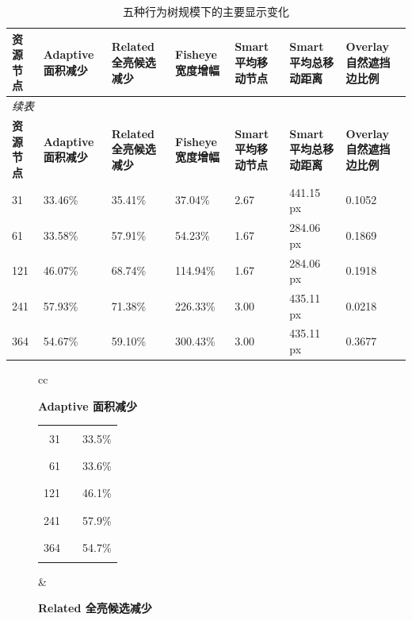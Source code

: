 \documentclass[11pt,a4paper,oneside,extrafontsizes]{memoir}
\begin{document}
\begin{center}

\begin{longtable}{@{}p{} p{} p{} p{} p{} p{} p{}@{}}
\caption{五种行为树规模下的主要显示变化}\label{tab:tree-size-results}\\
\toprule
\textbf{资源节点} & \textbf{Adaptive 面积减少} & \textbf{Related 全亮候选减少} & \textbf{Fisheye 宽度增幅} & \textbf{Smart 平均移动节点} & \textbf{Smart 平均总移动距离} & \textbf{Overlay 自然遮挡边比例} \\
\midrule
\endfirsthead
\multicolumn{7}{l}{\itshape 续表}\\
\toprule
\textbf{资源节点} & \textbf{Adaptive 面积减少} & \textbf{Related 全亮候选减少} & \textbf{Fisheye 宽度增幅} & \textbf{Smart 平均移动节点} & \textbf{Smart 平均总移动距离} & \textbf{Overlay 自然遮挡边比例} \\
\midrule
\endhead
31 & 33.46\% & 35.41\% & 37.04\% & 2.67 & 441.15 px & 0.1052 \\
61 & 33.58\% & 57.91\% & 54.23\% & 1.67 & 284.06 px & 0.1869 \\
121 & 46.07\% & 68.74\% & 114.94\% & 1.67 & 284.06 px & 0.1918 \\
241 & 57.93\% & 71.38\% & 226.33\% & 3.00 & 435.11 px & 0.0218 \\
364 & 54.67\% & 59.10\% & 300.43\% & 3.00 & 435.11 px & 0.3677 \\
\bottomrule
\end{longtable}

\begin{figure}[htbp]
\centering

\begin{tabular}{cc}
\begin{minipage}[t]{0.46\textwidth}
\centering
\textbf{Adaptive 面积减少}\\[-0.2em]

\begin{tabular}{@{}r l r@{}}
31 & \textcolor{blue!70!black}{\rule{0.1155\textwidth}{1.1ex}} & 33.5\% \\
61 & \textcolor{blue!70!black}{\rule{0.1159\textwidth}{1.1ex}} & 33.6\% \\
121 & \textcolor{blue!70!black}{\rule{0.1591\textwidth}{1.1ex}} & 46.1\% \\
241 & \textcolor{blue!70!black}{\rule{0.2000\textwidth}{1.1ex}} & 57.9\% \\
364 & \textcolor{blue!70!black}{\rule{0.1887\textwidth}{1.1ex}} & 54.7\% \\
\end{tabular}
\end{minipage}
&
\begin{minipage}[t]{0.46\textwidth}
\centering
\textbf{Related 全亮候选减少}\\[-0.2em]


\end{minipage}
\end{tabular}
\end{figure}
\end{center}
\end{document}
